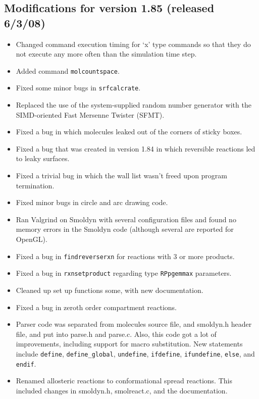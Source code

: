 \documentclass {scrbook}
\newcommand {\ttt} {\texttt}
\begin{document}
\subsection{Modifications for version 1.85 (released 6/3/08)}
\begin{itemize}
\item Changed command execution timing for `x' type commands so that they do not execute any more often than the simulation time step.
\item Added command \ttt{molcountspace}.
\item Fixed some minor bugs in \ttt{srfcalcrate}.
\item Replaced the use of the system-supplied random number generator with the SIMD-oriented Fast Mersenne Twister (SFMT).
\item Fixed a bug in which molecules leaked out of the corners of sticky boxes.
\item Fixed a bug that was created in version 1.84 in which reversible reactions led to leaky surfaces.
\item Fixed a trivial bug in which the wall list wasn't freed upon program termination.
\item Fixed minor bugs in circle and arc drawing code.
\item Ran Valgrind on Smoldyn with several configuration files and found no memory errors in the Smoldyn code (although several are reported for OpenGL).
\item Fixed a bug in \ttt{findreverserxn} for reactions with 3 or more products.
\item Fixed a bug in \ttt{rxnsetproduct} regarding type \ttt{RPpgemmax} parameters.
\item Cleaned up set up functions some, with new documentation.
\item Fixed a bug in zeroth order compartment reactions.
\item Parser code was separated from molecules source file, and smoldyn.h header file, and put into parse.h and parse.c. Also, this code got a lot of improvements, including support for macro substitution. New statements include \ttt{define}, \ttt{define\_global}, \ttt{undefine}, \ttt{ifdefine}, \ttt{ifundefine}, \ttt{else}, and \ttt{endif}.
\item Renamed allosteric reactions to conformational spread reactions. This included changes in smoldyn.h, smolreact.c, and the documentation.
\end{itemize}
\end{document}
